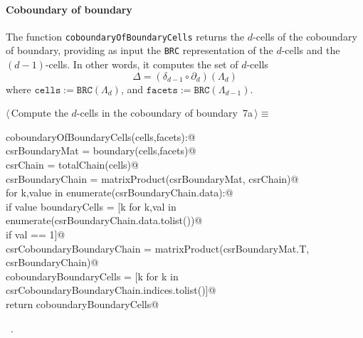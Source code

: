\documentclass[11pt,oneside]{article}	%
\begin{document}
\paragraph{Coboundary of boundary}

The function \texttt{coboundaryOfBoundaryCells} returns the $d$-cells of the coboundary of boundary, providing as input the \texttt{BRC} representation of the $d$-cells and the $(d-1)$-cells. In other words, it computes the set of $d$-cells
\[
\Delta = (\delta_{d-1}\circ\partial_d)(\Lambda_d)
\]
where $\texttt{cells} := \texttt{BRC}(\Lambda_d)$, and $\texttt{facets} := \texttt{BRC}(\Lambda_{d-1})$.

\begin{flushleft} \small \label{scrap12}
\protect{}$\langle\,$Compute the $d$-cells in the coboundary of boundary\nobreak\ {\footnotesize 7a}$\,\rangle\equiv$
\vspace{-1ex}
\begin{list}{}{} \item
\mbox{}\verb@def coboundaryOfBoundaryCells(cells,facets):@\\
\mbox{}\verb@    csrBoundaryMat = boundary(cells,facets)@\\
\mbox{}\verb@    csrChain = totalChain(cells)@\\
\mbox{}\verb@    csrBoundaryChain = matrixProduct(csrBoundaryMat, csrChain)@\\
\mbox{}\verb@    for k,value in enumerate(csrBoundaryChain.data):@\\
\mbox{}\verb@        if value % 2 == 0: csrBoundaryChain.data[k] = 0@\\
\mbox{}\verb@    boundaryCells = [k for k,val in enumerate(csrBoundaryChain.data.tolist())@\\
\mbox{}\verb@                               if val == 1]@\\
\mbox{}\verb@    csrCoboundaryBoundaryChain = matrixProduct(csrBoundaryMat.T, csrBoundaryChain)@\\
\mbox{}\verb@    coboundaryBoundaryCells = [k for k in csrCoboundaryBoundaryChain.indices.tolist()]@\\
\mbox{}\verb@    return coboundaryBoundaryCells@\\
\mbox{}\verb@@{\NWsep}
\end{list}
\vspace{-1ex}
\footnotesize\addtolength{\baselineskip}{-1ex}
\begin{list}{}{\setlength{\itemsep}{-\parsep}\setlength{\itemindent}{-\leftmargin}}
\item \NWtxtMacroRefIn\ .
\end{list}
\end{flushleft}
\end{document}
